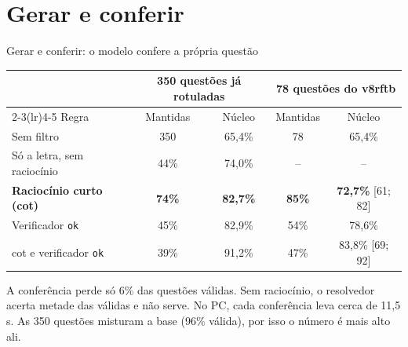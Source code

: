 \documentclass[aspectratio=169,11pt]{beamer}
\begin{document}
\section{Gerar e conferir}
\begin{frame}{Gerar e conferir: o modelo confere a própria questão}
  \centering
  \vspace{4pt}

  \scriptsize
  \begin{tabular}{@{}lcccc@{}}
    \toprule
    & \multicolumn{2}{c}{350 questões já rotuladas} & \multicolumn{2}{c}{78 questões do v8rftb} \\
    \cmidrule(lr){2-3}\cmidrule(lr){4-5}
    Regra & Mantidas & Núcleo & Mantidas & Núcleo \\
    \midrule
    Sem filtro & 350 & 65,4\% & 78 & 65,4\% \\
    Só a letra, sem raciocínio & 44\% & 74,0\% & -- & -- \\
    \textbf{Raciocínio curto (cot)} & \textbf{74\%} & \textbf{82,7\%} & \textbf{85\%} & \textbf{72,7\%} [61; 82] \\
    Verificador \texttt{ok} & 45\% & 82,9\% & 54\% & 78,6\% \\
    cot e verificador \texttt{ok} & 39\% & 91,2\% & 47\% & 83,8\% [69; 92] \\
    \bottomrule
  \end{tabular}
  \vspace{4pt}

  \raggedright\footnotesize
  A conferência perde só 6\% das questões válidas. Sem raciocínio, o resolvedor acerta metade das válidas e não serve.
  No PC, cada conferência leva cerca de 11,5 s. As 350 questões misturam a base (96\% válida), por isso o número é mais alto ali.
\end{frame}
\end{document}
